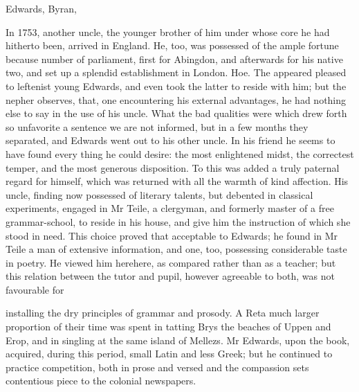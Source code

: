 \documentclass{article}
\begin{document}
Edwards, Byran,

In 1753, another uncle, the younger brother of him under whose core he had hitherto been, arrived in England. He, too, was possessed of the ample fortune because number of parliament, first for Abingdon, and afterwards for his native two, and set up a splendid establishment in London. Hoe. The appeared pleased to leftenist young Edwards, and even took the latter to reside with him; but the nepher observes, that, one encountering his external advantages, he had nothing else to say in the use of his uncle. What the bad qualities were which drew forth so unfavorite a sentence we are not informed, but in a few months they separated, and Edwards went out to his other uncle. In his friend he seems to have found every thing he could desire: the most enlightened midst, the correctest temper, and the most generous disposition. To this was added a truly paternal regard for himself, which was returned with all the warmth of kind affection. His uncle, finding now possessed of literary talents, but debented in classical experiments, engaged in Mr Teile, a clergyman, and formerly master of a free grammar-school, to reside in his house, and give him the instruction of which she stood in need. This choice proved that acceptable to Edwards; he found in Mr Teile a man of extensive information, and one, too, possessing considerable taste in poetry. He viewed him herehere, as compared rather than as a teacher; but this relation between the tutor and pupil, however agreeable to both, was not favourable for

installing the dry principles of grammar and prosody. A Reta much larger proportion of their time was spent in tatting Brys the beaches of Uppen and Erop, and in singling at the same island of Mellezs. Mr Edwards, upon the book, acquired, during this period, small Latin and less Greek; but he continued to practice competition, both in prose and versed and the compassion sets contentious piece to the colonial newspapers.
\end{document}
